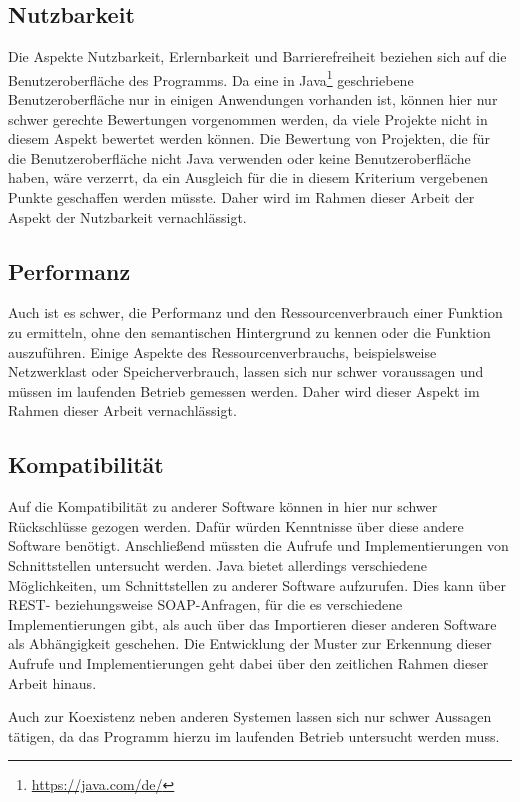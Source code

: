 \documentclass[
	oneside,  %
	ngerman, 
	final, 
	11pt, 
	a4paper, 
	1.1headlines, 
	headinclude=false, 
	footinclude=false, 
	mpinclude=false, 
	pagesize, 
	onecolumn, 
	titlepage, 
	parskip=half, 
	headsepline, 
	chapterprefix=false, 
	version=first, 
	listof=totoc, 
	bibliography=totoc, 
	toc=graduated, 
	fleqn
]{scrbook}
\begin{document}
\subsection{Nutzbarkeit}
Die Aspekte Nutzbarkeit, Erlernbarkeit und Barrierefreiheit beziehen sich auf die Benutzeroberfläche des Programms.
Da eine in Java\footnote{\url{https://java.com/de/}} geschriebene Benutzeroberfläche nur in einigen Anwendungen vorhanden ist, können hier nur schwer gerechte Bewertungen vorgenommen werden, da viele Projekte nicht in diesem Aspekt bewertet werden können.
Die Bewertung von Projekten, die für die Benutzeroberfläche nicht Java verwenden oder keine Benutzeroberfläche haben, wäre verzerrt, da ein Ausgleich für die in diesem Kriterium vergebenen Punkte geschaffen werden müsste.
Daher wird im Rahmen dieser Arbeit der Aspekt der Nutzbarkeit vernachlässigt.

\subsection{Performanz}
Auch ist es schwer, die Performanz und den Ressourcenverbrauch einer Funktion zu ermitteln, ohne den semantischen Hintergrund zu kennen oder die Funktion auszuführen.
Einige Aspekte des Ressourcenverbrauchs, beispielsweise Netzwerklast oder Speicherverbrauch, lassen sich nur schwer voraussagen und müssen im laufenden Betrieb gemessen werden.
Daher wird dieser Aspekt im Rahmen dieser Arbeit vernachlässigt.

\subsection{Kompatibilität}
Auf die Kompatibilität zu anderer Software können in hier nur schwer Rückschlüsse gezogen werden.
Dafür würden Kenntnisse über diese andere Software benötigt.
Anschließend müssten die Aufrufe und Implementierungen von Schnittstellen untersucht werden.
Java bietet allerdings verschiedene Möglichkeiten, um Schnittstellen zu anderer Software aufzurufen.
Dies kann über \acf{REST}- beziehungsweise \acf{SOAP}-Anfragen, für die es verschiedene Implementierungen gibt, als auch über das Importieren dieser anderen Software als Abhängigkeit geschehen.
Die Entwicklung der Muster zur Erkennung dieser Aufrufe und Implementierungen geht dabei über den zeitlichen Rahmen dieser Arbeit hinaus.

Auch zur Koexistenz neben anderen Systemen lassen sich nur schwer Aussagen tätigen, da das Programm hierzu im laufenden Betrieb untersucht werden muss.
\end{document}
